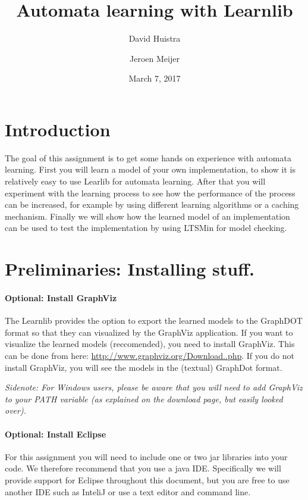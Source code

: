\documentclass[a4paper]{article}
\title{Automata learning with Learnlib}
\author{David Huistra \and Jeroen Meijer}
\date{March 7, 2017}
\newcommand{\deadline}{\emph{February 16, 2016, 8:45 hours}\xspace}
\begin{document}
\maketitle

\section*{Introduction}
The goal of this assignment is to get some hands on experience with automata learning. First you will learn a model of your own implementation, to show it is relatively easy to use Learlib for automata learning. After that you will experiment with the learning process to see how the performance of the process can be increased, for example by using different learning algorithms or a caching mechanism. Finally we will show how the learned model of an implementation can be used to test the implementation by using LTSMin for model checking.


\section*{Preliminaries: Installing stuff.}

\paragraph{Optional: Install GraphViz}
The Learnlib provides the option to export the learned models to the GraphDOT format so that they can visualized by the GraphViz application. If you want to visualize the learned models (reccomended), you need to install GraphViz. This can be done from here: \url{http://www.graphviz.org/Download..php}. If you do not install GraphViz, you will see the models in the (textual) GraphDot format.

\emph{Sidenote: For Windows users, please be aware that you will need to add GraphViz to your PATH variable (as explained on the download page, but easily looked over).}

\paragraph{Optional: Install Eclipse}
For this assignment you will need to include one or two jar libraries into your code. We therefore recommend that you use a java IDE. Specifically we will provide support for Eclipse throughout this document, but you are free to use another IDE such as InteliJ or use a text editor and command line.
\end{document}
